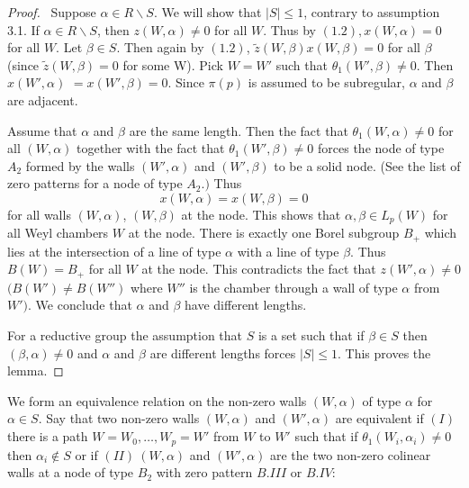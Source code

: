\documentclass{memo-l}
\theoremstyle{definition}
\theoremstyle{remark}
\numberwithin{section}{chapter}
\numberwithin{equation}{chapter}
\begin{document}
\begin{proof} \ Suppose ${\alpha} \in R\backslash S$.  We will show
that $\vert S\vert \le 1$, contrary to assumption 3.1.  If ${\alpha}
\in R\backslash S$, then $z(W,{\alpha})\ne 0$ for all $W$.  Thus by
$(1.2), x(W,{\alpha}) = 0$ for all $W$.  Let ${\beta}  \in  S$.  Then again
by $(1.2)$, $\tilde z (W,{\beta})x(W,{\beta}) = 0$ for all ${\beta}$ (since
$\tilde z (W,{\beta}) = 0$ for some W).  Pick $W = W'$ such that
${\theta}_{1}(W',{\beta})\ne 0$.  Then $x(W',{\alpha})$ $= x(W',{\beta}) =
0$.  Since ${\pi}(p)$ is assumed to be subregular, ${\alpha}$ and ${\beta}$
are adjacent.

   Assume that ${\alpha}$ and ${\beta}$ are the same length.  Then the fact
that ${\theta}_{1}(W,{\alpha})\ne 0$ for all $(W,{\alpha})$ together with
the fact that ${\theta}_{1}(W',{\beta})\ne 0$ forces the node of type
$A_{2}$ formed by the walls $(W',{\alpha})$ and $(W',{\beta})$ to be a
solid node.  (See the list of zero patterns for a node of type $A_{2}.)$
Thus $$x(W,{\alpha}) = x(W,{\beta}) = 0$$ for all walls $(W,{\alpha})$,
$(W,{\beta})$ at the node.  This shows that ${\alpha}, {\beta}  \in
L_{p}(W)$ for all Weyl chambers $W$ at the node.  There is exactly one
Borel subgroup $B_{+}$ which lies at the intersection of a line of type
${\alpha}$ with a line of type ${\beta}$.  Thus $B(W) = B_{+}$ for all $W$
at the node.  This contradicts the fact that $z(W',{\alpha})\ne 0$
$(B(W')\ne
B(W'')$ where $W''$ is the chamber through a wall of type ${\alpha}$ from
$W')$.  We conclude that ${\alpha}$ and ${\beta}$ have different lengths.

   For a reductive group the assumption that $S$ is a set such that if
${\beta}  \in  S$ then $({\beta},{\alpha})\ne 0$ and ${\alpha}$ and
${\beta}$ are different lengths forces $\vert S\vert \le 1$.  This
proves the lemma.
\end{proof}

{\medskip}


   We form an equivalence relation on the non-zero walls $(W,{\alpha})$ of
type ${\alpha}$ for ${\alpha}  \in  S$.  Say that two non-zero walls
$(W,{\alpha})$ and $(W',{\alpha})$ are equivalent if $(I)$ there is a path
$W = W_{0},\ldots ,W_{p} = W'$ from $W$ to $W'$ such that if
${\theta}_{1}(W_{i},{\alpha}_{i})\ne 0$ then ${\alpha}_{i} {\notin} S$ or
if $(II) \ (W,{\alpha})$ and $(W',{\alpha})$ are the two non-zero colinear
walls at a node of type $B_{2}$ with zero pattern $B.III$ or $B.IV$:
\medskip
\medskip
\end{document}

